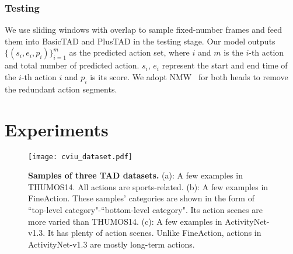 \documentclass[a4paper,fleqn]{cas-dc}
\begin{document}
\subsubsection{Testing}
We use sliding windows with overlap to sample fixed-number frames and feed them into BasicTAD and PlusTAD in the testing stage. 
Our model outputs $\{(s_i,e_i,p_i)\}_{i=1}^{m}$ as the predicted action set, where $i$ and $m$ is the $i$-th action and total number of predicted action. $s_i$, $e_i$ represent the start and end time of the $i$-th action $i$ and $p_i$ is its score. 
We adopt NMW~\citep{nmw} for both heads to remove the redundant action segments.

\section{Experiments}

\begin{table}[t]
\centering
\small
\caption{\textbf{Summary of three datasets.} Video number, category number and other information about THUMOS14, FineAction and ActivityNet-v1.3 are listed in this table.}
\label{table:dataset_info}
\end{table}

\begin{figure}[!t]
  \texttt{[image: cviu\_dataset.pdf]}
  \caption{
\textbf{Samples of three TAD datasets.} (a): A few examples in THUMOS14. All actions are sports-related. (b): A few examples in FineAction. These samples' categories are shown in the form of ``top-level category"-``bottom-level category". Its action scenes are more varied than THUMOS14. (c): A few examples in ActivityNet-v1.3. It has plenty of action scenes. Unlike FineAction, actions in ActivityNet-v1.3 are mostly long-term actions.
}
  \label{fig:cviu_dataset}
\end{figure}
\end{document}

